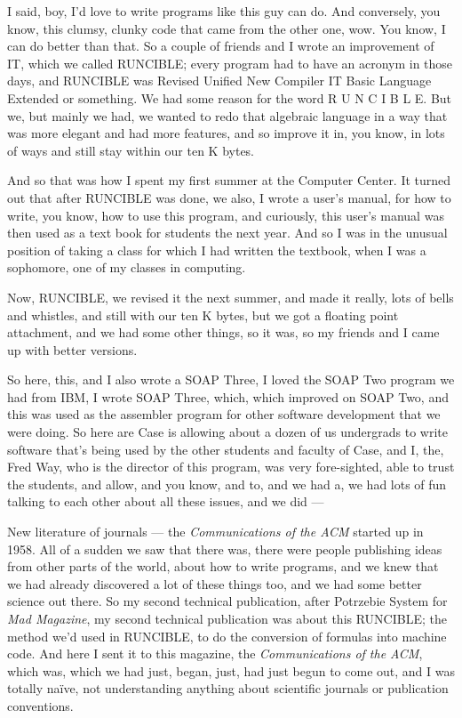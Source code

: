 \documentclass[]{article}
\begin{document}
I said, boy, I'd love to write programs like this guy can do. And
conversely, you know, this clumsy, clunky code that came from the other
one, wow. You know, I can do better than that. So a couple of friends
and I wrote an improvement of IT, which we called RUNCIBLE; every
program had to have an acronym in those days, and RUNCIBLE was Revised
Unified New Compiler IT Basic Language Extended or something. We had
some reason for the word R U N C I B L E. But we, but mainly we had, we
wanted to redo that algebraic language in a way that was more elegant
and had more features, and so improve it in, you know, in lots of ways
and still stay within our ten K bytes.

And so that was how I spent my first summer at the Computer Center. It
turned out that after RUNCIBLE was done, we also, I wrote a user's
manual, for how to write, you know, how to use this program, and
curiously, this user's manual was then used as a text book for students
the next year. And so I was in the unusual position of taking a class
for which I had written the textbook, when I was a sophomore, one of my
classes in computing.

Now, RUNCIBLE, we revised it the next summer, and made it really, lots
of bells and whistles, and still with our ten K bytes, but we got a
floating point attachment, and we had some other things, so it was, so
my friends and I came up with better versions.

So here, this, and I also wrote a SOAP Three, I loved the SOAP Two
program we had from IBM, I wrote SOAP Three, which, which improved on
SOAP Two, and this was used as the assembler program for other software
development that we were doing. So here are Case is allowing about a
dozen of us undergrads to write software that's being used by the other
students and faculty of Case, and I, the, Fred Way, who is the director
of this program, was very fore-sighted, able to trust the students, and
allow, and you know, and to, and we had a, we had lots of fun talking to
each other about all these issues, and we did ---

New literature of journals --- the \emph{Communications of the ACM}
started up in 1958. All of a sudden we saw that there was, there were
people publishing ideas from other parts of the world, about how to
write programs, and we knew that we had already discovered a lot of
these things too, and we had some better science out there. So my second
technical publication, after Potrzebie System for \emph{Mad Magazine},
my second technical publication was about this RUNCIBLE; the method we'd
used in RUNCIBLE, to do the conversion of formulas into machine code.
And here I sent it to this magazine, the \emph{Communications of the
ACM}, which was, which we had just, began, just, had just begun to come
out, and I was totally naïve, not understanding anything about
scientific journals or publication conventions.
\end{document}
